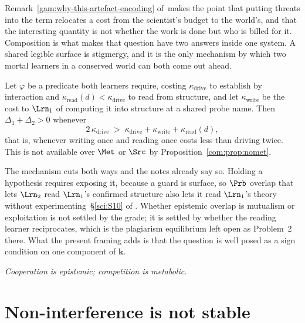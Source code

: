 Remark~\ref{gam:why-this-artefact-encoding} of~\chGame makes the point that putting threats into the term relocates a cost from
the scientist's budget to the world's, and that the interesting quantity is not whether the work
is done but who is billed for it. Composition is what makes that question have two answers
inside one system. A shared legible surface is stigmergy, and it is the only mechanism by which
two mortal learners in a conserved world can both come out ahead.

\begin{proposition}\label{com:epistemic-overlap-can-be}
Let $\varphi$ be a predicate both learners require, costing $\kappa_{\mathrm{drive}}$ to
establish by interaction and $\kappa_{\mathrm{read}}(d) < \kappa_{\mathrm{drive}}$ to read from
structure, and let $\kappa_{\mathrm{write}}$ be the cost to $\Lrn_1$ of computing it into
structure at a shared probe name. Then $\Delta_1 + \Delta_2 > 0$ whenever
\[
  2\,\kappa_{\mathrm{drive}} \;>\; \kappa_{\mathrm{drive}} + \kappa_{\mathrm{write}} +
  \kappa_{\mathrm{read}}(d),
\]
that is, whenever writing once and reading once costs less than driving twice. This is not
available over $\Met$ or $\Src$ by Proposition~\ref{com:prop:nomet}.
\end{proposition}

\begin{remark}\label{com:same-overlap-can-be}
The mechanism cuts both ways and the notes already say so. Holding a hypothesis requires
exposing it, because a guard is surface, so $\Prb$ overlap that lets $\Lrn_2$ read $\Lrn_1$'s
confirmed structure also lets it read $\Lrn_1$'s theory without experimenting~\S\ref{sci:S10} of \chSci.
Whether epistemic overlap is mutualism or exploitation is not settled by the grade; it is settled
by whether the reading learner reciprocates, which is the plagiarism equilibrium left open
as Problem~2 there. What the present framing adds is that the question is well posed as a sign
condition on one component of $\mathbf{k}$.
\end{remark}

\begin{center}
\emph{Cooperation is epistemic; competition is metabolic.}
\end{center}

\section{Non-interference is not stable}\label{com:sec:stability}\label{com:S7}

